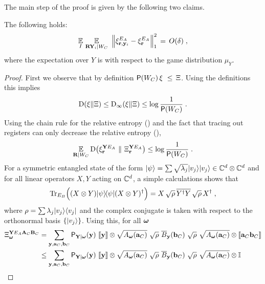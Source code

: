 The main step of the proof is given by the following two claims. 

\begin{claim}\label{claim:xi-change-x}
The following holds: 
\begin{equation}\label{eq:xi-change-1}
\Ex_I \, \Ex_{\bR \bY_i | W_C} \,\, \Big \| \xi^{E_A}_{\br,\by_i} -  \xi^{E_A}_{\br} \Big \|_1^2 \, =\, O(\delta)\;,
\end{equation}
where the expectation over $Y$ is with respect to the game distribution $\mu_{Y}$. 
\end{claim}

\begin{proof}

First we observe that by definition $\P(W_C) \, \xi\,\, \leq \,\Xi$. Using the definitions this implies
\[ \D(\xi \| \Xi)\leq \D_\infty(\xi \| \Xi) \leq \log \frac{1}{\P(W_C)}\;.\]
  Using the chain rule for the relative entropy () and the fact that tracing out registers can only decrease the relative entropy (), 
\begin{equation}\label{eq:claim23-1}
	\Ex_{\bR | W_C} \D \big (\xi_{\br}^{\bY E_A} \,\, \| \,\, \Xi_{\br}^{\bY E_A} \big ) \leq \log \frac{1}{\P(W_C)}\;.
\end{equation}
For a symmetric entangled state of the form $\ket{\psi} = \sum \sqrt{\lambda_j} \ket{v_j}\ket{v_j} \in \C^d \otimes \C^d$ and for all linear operators $X,Y$ acting on $\C^d$, a simple calculations shows that
\[
	\Tr_{E_B} \Big( (X \otimes Y)\ketbra{\psi}{\psi}(X \otimes Y)^\dagger \Big) = X \, \sqrt{\rho} \, \overline{Y^\dagger Y} \, \sqrt{\rho} \, X^\dagger\;,
\]
where $\rho = \sum \lambda_j \ket{v_j}\bra{v_j}$ and the complex conjugate is taken with respect to the orthonormal basis $\{\ket{v_j}\}$.  
	Using this, for all $\bomega$
	\begin{align}
		\Xi_\bomega^{\bY E_A \bA_C \bB_C} &= \sum_{\by, \ba_C, \bb_C} \P_{\bY | \bomega}(\by) \,\, \puretomixed{\by} \otimes \sqrt{A_\bomega(\ba_C)} \,\, \sqrt{\rho} \,\, \overline{B}_{\by}(\bb_C) \,\, \sqrt{\rho} \,\, \sqrt{A_\bomega(\ba_C)}  \otimes \puretomixed{\ba_C \bb_C}\notag \\
		&\leq  \sum_{\by, \ba_C, \bb_C} \P_{\bY | \bomega}(\by) \,\, \puretomixed{\by} \otimes \sqrt{A_\bomega(\ba_C)} \,\, \sqrt{\rho} \,\, \overline{B}_{\by}(\bb_C) \,\, \sqrt{\rho} \,\, \sqrt{A_\bomega(\ba_C)} \otimes \Id \notag\\

\end{align}
\end{proof}

